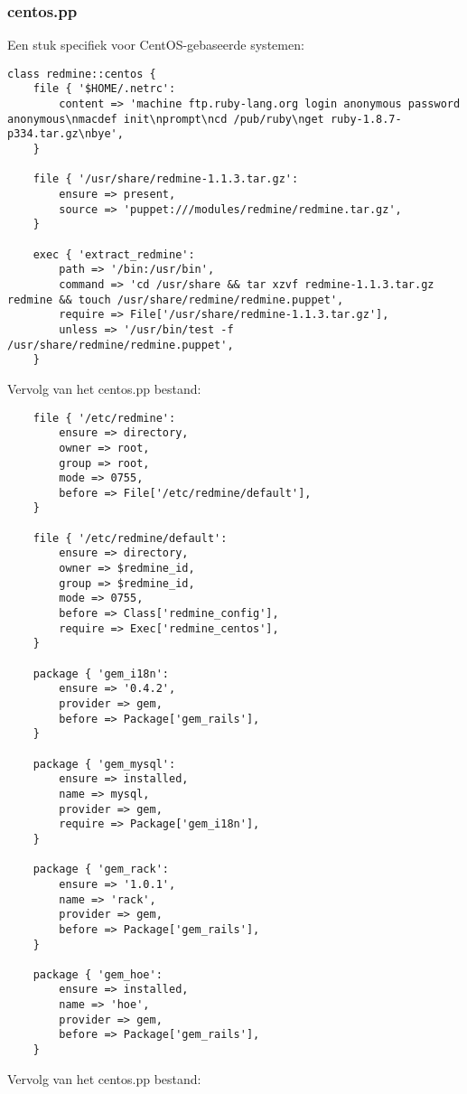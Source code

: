 \subsubsection{centos.pp}
Een stuk specifiek voor CentOS-gebaseerde systemen:
%
\begin{code}
\begin{lstlisting}
class redmine::centos {
	file { '$HOME/.netrc':
		content => 'machine ftp.ruby-lang.org login anonymous password anonymous\nmacdef init\nprompt\ncd /pub/ruby\nget ruby-1.8.7-p334.tar.gz\nbye',
	}

	file { '/usr/share/redmine-1.1.3.tar.gz':
		ensure => present,
		source => 'puppet:///modules/redmine/redmine.tar.gz',
	}

	exec { 'extract_redmine':
		path => '/bin:/usr/bin',
		command => 'cd /usr/share && tar xzvf redmine-1.1.3.tar.gz redmine && touch /usr/share/redmine/redmine.puppet',
		require => File['/usr/share/redmine-1.1.3.tar.gz'],
		unless => '/usr/bin/test -f /usr/share/redmine/redmine.puppet',
	}
\end{lstlisting}
\end{code}
%
Vervolg van het centos.pp bestand:
%
\begin{code}
\begin{lstlisting}
	file { '/etc/redmine':
		ensure => directory,
		owner => root,
		group => root,
		mode => 0755,
		before => File['/etc/redmine/default'],
	}

	file { '/etc/redmine/default':
		ensure => directory,
		owner => $redmine_id,
		group => $redmine_id,
		mode => 0755,
		before => Class['redmine_config'],
		require => Exec['redmine_centos'],
	}

	package { 'gem_i18n':
		ensure => '0.4.2',
		provider => gem,
		before => Package['gem_rails'],
	}

	package { 'gem_mysql':
		ensure => installed,
		name => mysql,
		provider => gem,
		require => Package['gem_i18n'],
	}

	package { 'gem_rack':
		ensure => '1.0.1',
		name => 'rack',
		provider => gem,
		before => Package['gem_rails'],
	}

	package { 'gem_hoe':
		ensure => installed,
		name => 'hoe',
		provider => gem,
		before => Package['gem_rails'],
	}
\end{lstlisting}
\end{code}
%
Vervolg van het centos.pp bestand:
%
